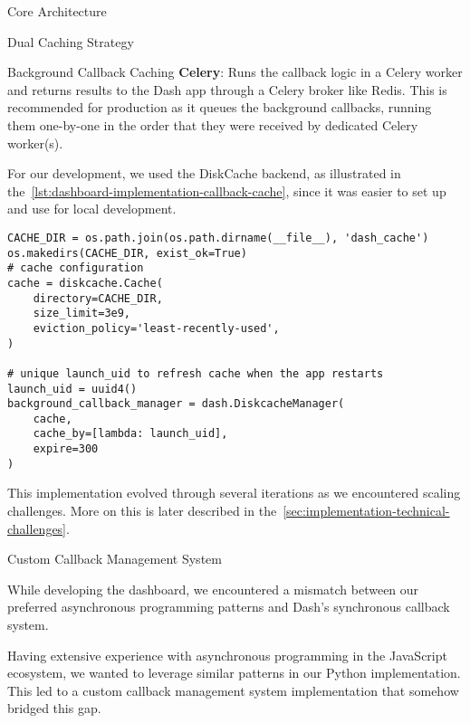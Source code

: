 \begin{section}{Core Architecture}
\begin{subsection}{Dual Caching Strategy}
\begin{subsubsection}{Background Callback Caching}
			\textbf{Celery}: Runs the callback logic in a Celery worker\cite{celery_userguide_workers} and returns results to the Dash app through a Celery broker like Redis.
			This is recommended for production as it queues the background callbacks, running them one-by-one in the order that they were received by dedicated Celery worker(s).

			For our development, we used the DiskCache backend, as illustrated in the~\autoref{lst:dashboard-implementation-callback-cache}, since it was easier to set up and use for local development.

			\begin{listing}[H]
				\caption{DiskCache Background Callback Manager Setup}
				\begin{verbatim}
CACHE_DIR = os.path.join(os.path.dirname(__file__), 'dash_cache')
os.makedirs(CACHE_DIR, exist_ok=True)
# cache configuration
cache = diskcache.Cache(
	directory=CACHE_DIR,
	size_limit=3e9,
	eviction_policy='least-recently-used',
)

# unique launch_uid to refresh cache when the app restarts
launch_uid = uuid4()
background_callback_manager = dash.DiskcacheManager(
	cache,
	cache_by=[lambda: launch_uid],
	expire=300
)
				\end{verbatim}
				\label{lst:dashboard-implementation-callback-cache}
			\end{listing}

			This implementation evolved through several iterations as we encountered scaling challenges.
			More on this is later described in the~\autoref{sec:implementation-technical-challenges}.
		\end{subsubsection}
	\end{subsection}

	\begin{subsection}{Custom Callback Management System}
		\label{subsec:implementation-core-architecture-callbacks}

		While developing the dashboard, we encountered a mismatch between our preferred asynchronous programming patterns and Dash's synchronous callback system.

		Having extensive experience with asynchronous programming in the JavaScript ecosystem, we wanted to leverage similar patterns in our Python implementation.
		This led to a custom callback management system implementation that somehow bridged this gap.


\end{subsection}
\end{section}
